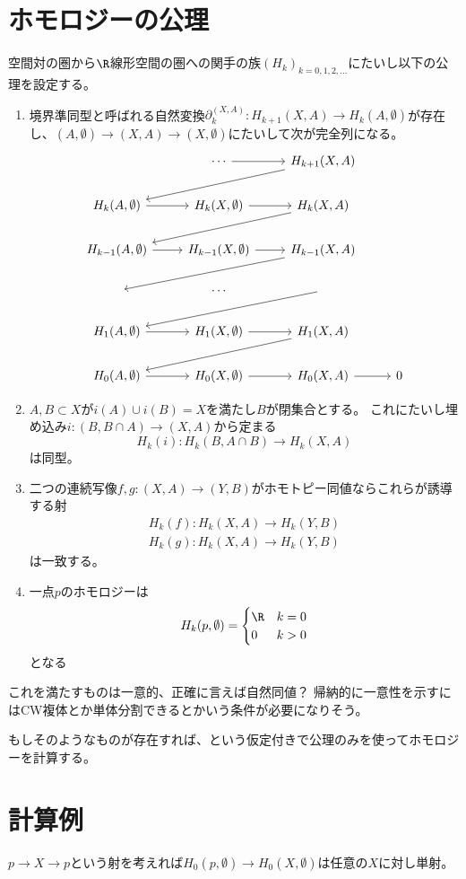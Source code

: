 \documentclass{jsarticle}
\begin{document}
\section{ホモロジーの公理}
\begin{dfn}
空間対の圏から$\R$線形空間の圏への関手の族$(H_k)_{k=0,1,2,\ldots}$にたいし以下の公理を設定する。
\begin{enumerate}
\item 境界準同型と呼ばれる自然変換$\partial^{(X,A)}_k\colon H_{k+1}(X,A)\to H_k(A,\emptyset)$が存在し、$(A,\emptyset)\to(X,A)\to(X,\emptyset)$にたいして次が完全列になる。
\[
\begin{tikzcd}
~ &\cdots \ar[r] &H_{k+1}(X,A) \ar[dll]\\
H_k(A,\emptyset) \ar[r] &H_k(X,\emptyset) \ar[r] &H_k(X,A) \ar[dll]\\
H_{k-1}(A,\emptyset) \ar[r] &H_{k-1}(X,\emptyset) \ar[r] &H_{k-1}(X,A) \ar[dll]\\
~&\cdots&\ar[dll]\\
H_{1}(A,\emptyset) \ar[r] &H_{1}(X,\emptyset) \ar[r] &H_{1}(X,A) \ar[dll]\\
H_{0}(A,\emptyset) \ar[r] &H_{0}(X,\emptyset) \ar[r] &H_{0}(X,A) \ar[r]&0
\end{tikzcd}
\]
\item $A,B\subset X$が$i(A)\cup i(B)=X$を満たし$B$が閉集合とする。
これにたいし埋め込み$i\colon(B,B\cap A)\to(X,A)$から定まる
\[
H_k(i)\colon H_k(B,A\cap B)\to H_k(X,A)
\]
は同型。
\item 二つの連続写像$f, g\colon (X,A)\to (Y,B)$がホモトピー同値ならこれらが誘導する射
\begin{align*}
H_k(f)\colon H_k(X,A)\to H_k(Y,B)\\
H_k(g)\colon H_k(X,A)\to H_k(Y,B)
\end{align*} 
は一致する。
\item 一点$p$のホモロジーは
\[
H_k(p,\emptyset)=\begin{cases}\R&k=0\\0&k>0\end{cases}
\]
となる
\end{enumerate}
\end{dfn}
これを満たすものは一意的、正確に言えば自然同値？
帰納的に一意性を示すにはCW複体とか単体分割できるとかいう条件が必要になりそう。

もしそのようなものが存在すれば、という仮定付きで公理のみを使ってホモロジーを計算する。
\section{計算例}
\begin{prop}
$p\to X\to p$という射を考えれば$H_0(p,\emptyset)\to H_0(X,\emptyset)$は任意の$X$に対し単射。
\end{prop}
\end{document}
